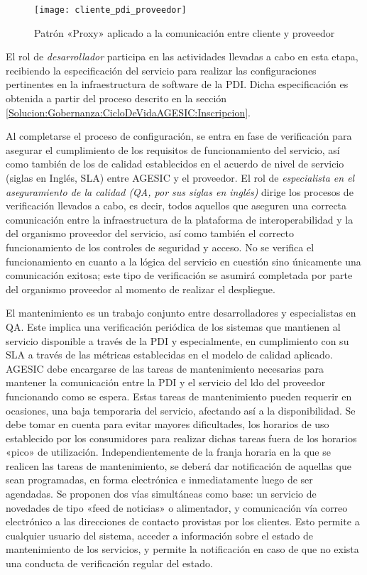       \begin{figure}[h]
        \centering
        \texttt{[image: cliente\_pdi\_proveedor]}
        \caption{Patrón «Proxy» aplicado a la comunicación entre cliente y proveedor}
        \label{Figura:ComunicacionProxyClienteProveedor}
      \end{figure}

      El rol de \emph{desarrollador} participa en las actividades llevadas a cabo en esta etapa, recibiendo la especificación del servicio para realizar las configuraciones pertinentes en la infraestructura de software de la PDI. Dicha especificación es obtenida a partir del proceso descrito en la sección \ref{Solucion:Gobernanza:CicloDeVidaAGESIC:Inscripcion}.

      Al completarse el proceso de configuración, se entra en fase de verificación para asegurar el cumplimiento de los requisitos de funcionamiento del servicio, así como también de los de calidad establecidos en el acuerdo de nivel de servicio (siglas en Inglés, SLA) entre AGESIC y el proveedor. El rol de \emph{especialista en el aseguramiento de la calidad (QA, por sus siglas en inglés)} dirige los procesos de verificación llevados a cabo, es decir, todos aquellos que aseguren una correcta comunicación entre la infraestructura de la plataforma de interoperabilidad y la del organismo proveedor del servicio, así como también el correcto funcionamiento de los controles de seguridad y acceso. No se verifica el funcionamiento en cuanto a la lógica del servicio en cuestión sino únicamente una comunicación exitosa; este tipo de verificación se asumirá completada por parte del organismo proveedor al momento de realizar el despliegue.

      El mantenimiento es un trabajo conjunto entre desarrolladores y especialistas en QA. Este implica una verificación periódica de los sistemas que mantienen al servicio disponible a través de la PDI y especialmente, en cumplimiento con su SLA a través de las métricas establecidas en el modelo de calidad aplicado. AGESIC debe encargarse de las tareas de mantenimiento necesarias para mantener la comunicación entre la PDI y el servicio del ldo del proveedor funcionando como se espera. Estas tareas de mantenimiento pueden requerir en ocasiones, una baja temporaria del servicio, afectando así a la disponibilidad. Se debe tomar en cuenta para evitar mayores dificultades, los horarios de uso establecido por los consumidores para realizar dichas tareas fuera de los horarios «pico» de utilización. Independientemente de la franja horaria en la que se realicen las tareas de mantenimiento, se deberá dar notificación de aquellas que sean programadas, en forma electrónica e inmediatamente luego de ser agendadas. Se proponen dos vías simultáneas como base: un servicio de novedades de tipo «feed de noticias» o alimentador, y comunicación vía correo electrónico a las direcciones de contacto provistas por los clientes. Esto permite a cualquier usuario del sistema, acceder a información sobre el estado de mantenimiento de los servicios, y permite la notificación en caso de que no exista una conducta de verificación regular del estado.

